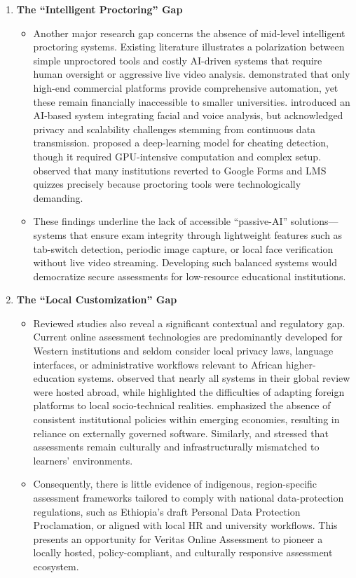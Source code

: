 \begin{enumerate}
    \item \textbf{The ``Intelligent Proctoring” Gap} 
        \begin{itemize}
            \item Another major research gap concerns the absence of mid-level intelligent proctoring systems. Existing literature illustrates a polarization between simple unproctored tools and costly AI-driven systems that require human oversight or aggressive live video analysis. \citet{Arno2021} demonstrated that only high-end commercial platforms provide comprehensive automation, yet these remain financially inaccessible to smaller universities. \citet{JiaHe2021} introduced an AI-based system integrating facial and voice analysis, but acknowledged privacy and scalability challenges stemming from continuous data transmission. \citet{TiongLee2021} proposed a deep-learning model for cheating detection, though it required GPU-intensive computation and complex setup. \citet{Rahim2020} observed that many institutions reverted to Google Forms and LMS quizzes precisely because proctoring tools were technologically demanding.
            \item These findings underline the lack of accessible “passive-AI” solutions—systems that ensure exam integrity through lightweight features such as tab-switch detection, periodic image capture, or local face verification without live video streaming. Developing such balanced systems would democratize secure assessments for low-resource educational institutions.
        \end{itemize}
    
    \item \textbf{The “Local Customization” Gap} 
        \begin{itemize}
            \item Reviewed studies also reveal a significant contextual and regulatory gap. Current online assessment technologies are predominantly developed for Western institutions and seldom consider local privacy laws, language interfaces, or administrative workflows relevant to African higher-education systems. \citet{Topuz2022} observed that nearly all systems in their global review were hosted abroad, while \citet{Kurniati2023} highlighted the difficulties of adapting foreign platforms to local socio-technical realities. \citet{UcaGunes2024} emphasized the absence of consistent institutional policies within emerging economies, resulting in reliance on externally governed software. Similarly, \citet{Tabassum2025} and \citet{Ali2025} stressed that assessments remain culturally and infrastructurally mismatched to learners’ environments.
            \item Consequently, there is little evidence of indigenous, region-specific assessment frameworks tailored to comply with national data-protection regulations, such as Ethiopia’s draft Personal Data Protection Proclamation, or aligned with local HR and university workflows. This presents an opportunity for Veritas Online Assessment to pioneer a locally hosted, policy-compliant, and culturally responsive assessment ecosystem.
        \end{itemize}
    

\end{enumerate}
